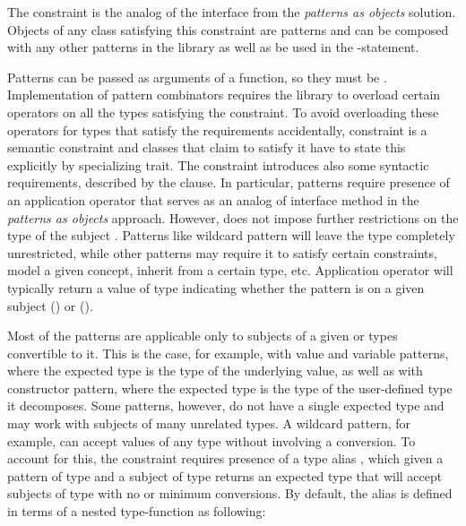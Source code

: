 
\noindent
The  constraint is the analog of the  interface from the 
\emph{patterns as objects} solution. Objects of any class  satisfying 
this constraint are patterns and can be composed with any other patterns in the 
library as well as be used in the -statement. 

Patterns can be passed as arguments of a function, so they must be
. Implementation of pattern combinators requires the 
library to overload certain operators on all the types satisfying the 
constraint. To avoid overloading these operators for types that satisfy the 
requirements accidentally,  constraint is a semantic constraint 
and classes that claim to satisfy it have to state this explicitly by specializing  
 trait. The constraint introduces also some syntactic 
requirements, described by the  clause. In particular, patterns 
require presence of an application operator that serves as an analog of 
 interface method in the \emph{patterns as 
objects} approach.
However,  does not impose further restrictions on the 
type of the subject . Patterns like wildcard pattern will leave the 
type completely unrestricted, while other patterns may require it to satisfy 
certain constraints, model a given concept, inherit from a certain type, etc.
Application operator will typically return a value of type  
indicating whether the pattern is  on a given subject 
() or  (). %

Most of the patterns are applicable only to subjects of a given  
or types convertible to it. This is the case, for example, with value and  
variable patterns, where the expected type is the type of the underlying value, 
as well as with constructor pattern, where the expected type is the type of the 
user-defined type it decomposes. Some patterns, however, do not have a single 
expected type and may work with subjects of many unrelated types. A wildcard 
pattern, for example, can accept values of any type without involving a 
conversion. To account for this, the  constraint requires presence of 
a type alias , which given a pattern of type  and 
a subject of type  returns an expected type  
that will accept subjects of type  with no or minimum conversions. 
By default, the alias is defined in terms of a nested type-function 
 as following:

